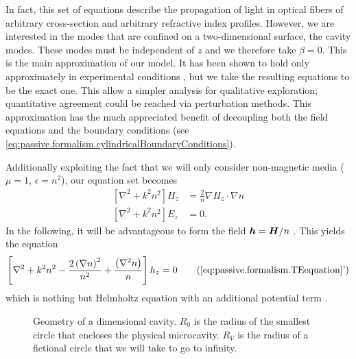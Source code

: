 
In fact, this set of equations describe the propagation of light 
in optical fibers of arbitrary cross-section and arbitrary
refractive index profiles. However, we are interested in the modes
that are confined on a two-dimensional surface, the cavity modes. 
These modes must be independent of $z$ and we therefore take 
$\beta=0$. This is the main approximation of our model. It has been shown
to hold only approximately in experimental conditions \cite{DUB2008,BIT2010}, 
but we take the resulting equations to be the exact one. This allow a 
simpler analysis for qualitative exploration; quantitative agreement
could be reached via perturbation methods. This approximation 
has the much appreciated benefit of decoupling both the field
equations and the boundary conditions (see \eqref{eq:passive.formalism.cylindricalBoundaryConditions}).

Additionally exploiting the fact that we will only consider
non-magnetic media ($\mu=1$, $\epsilon=n^2$), our equation set becomes
  \begin{subequations}
  \label{eq:passive.formalism.fieldEquations}
  \begin{align}
    \left[\nabla^2+k^2n^2\right] H_z	&= \frac{2}{n}\nabla H_z\cdot\nabla n	\label{eq:passive.formalism.TEequation}\\
    \left[\nabla^2+k^2n^2\right] E_z	&= 0. 
  \end{align}
  \end{subequations}
In the following, it will be advantageous to form the field
$\boldsymbol{h}=\boldsymbol{H}/n$ \cite{DET2009}. This yields the equation
\cite{DET2009, GAP2013a}
  \begin{equation}
   \left[\nabla^2+k^2n^2-\frac{2\left(\nabla n\right)^2}{n^2}+\frac{\left(\nabla^2n\right)}{n}\right]h_z=0 \tag{\ref{eq:passive.formalism.TEequation}'}
   \label{eq:passive.formalism.TEequationPrime}
  \end{equation}
which is nothing but Helmholtz equation with an additional potential term .

\begin{figure}
 \centering
 \def\svgwidth{0.4\textwidth}
 
 \caption[Geometry of a bidimensional cavity]
	 {Geometry of a dimensional cavity. $R_0$ is the radius of the smallest circle
	 that encloses the physical microcavity. $R_V$ is the radius of a fictional circle
	 that we will take to go to infinity.}
\end{figure}



